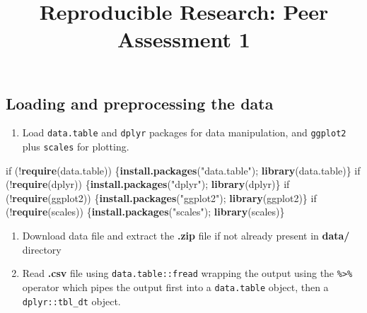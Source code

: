\documentclass[]{article}
\title{Reproducible Research: Peer Assessment 1}
\author{}
\date{}
\newenvironment{Shaded}{\begin{snugshade}}{\end{snugshade}}
\newcommand{\KeywordTok}[1]{\textcolor[rgb]{0.13,0.29,0.53}{\textbf{{#1}}}}
\newcommand{\StringTok}[1]{\textcolor[rgb]{0.31,0.60,0.02}{{#1}}}
\newcommand{\NormalTok}[1]{{#1}}
\begin{document}
\maketitle


{
\hypersetup{linkcolor=black}
\setcounter{tocdepth}{2}
\tableofcontents
}
\subsection{Loading and preprocessing the
data}\label{loading-and-preprocessing-the-data}

\begin{enumerate}
\def\labelenumi{\arabic{enumi}.}
\itemsep1pt\parskip0pt
\item
  Load \texttt{data.table} and \texttt{dplyr} packages for data
  manipulation, and \texttt{ggplot2} plus \texttt{scales} for plotting.
\end{enumerate}

\begin{Shaded}
\begin{Highlighting}[]
\NormalTok{if (!}\KeywordTok{require}\NormalTok{(data.table)) \{}\KeywordTok{install.packages}\NormalTok{(}\StringTok{"data.table"}\NormalTok{); }\KeywordTok{library}\NormalTok{(data.table)\}}
\NormalTok{if (!}\KeywordTok{require}\NormalTok{(dplyr)) \{}\KeywordTok{install.packages}\NormalTok{(}\StringTok{"dplyr"}\NormalTok{); }\KeywordTok{library}\NormalTok{(dplyr)\}}
\NormalTok{if (!}\KeywordTok{require}\NormalTok{(ggplot2)) \{}\KeywordTok{install.packages}\NormalTok{(}\StringTok{"ggplot2"}\NormalTok{); }\KeywordTok{library}\NormalTok{(ggplot2)\}}
\NormalTok{if (!}\KeywordTok{require}\NormalTok{(scales)) \{}\KeywordTok{install.packages}\NormalTok{(}\StringTok{"scales"}\NormalTok{); }\KeywordTok{library}\NormalTok{(scales)\}}
\end{Highlighting}
\end{Shaded}

\begin{enumerate}
\def\labelenumi{\arabic{enumi}.}
\setcounter{enumi}{1}
\itemsep1pt\parskip0pt
\item
  Download data file and extract the \textbf{.zip} file if not already
  present in \textbf{data/} directory
\item
  Read \textbf{.csv} file using \texttt{data.table::fread} wrapping the
  output using the \texttt{\%\textgreater{}\%} operator which pipes the
  output first into a \texttt{data.table} object, then a
  \texttt{dplyr::tbl\_dt} object.
\end{enumerate}
\end{document}
